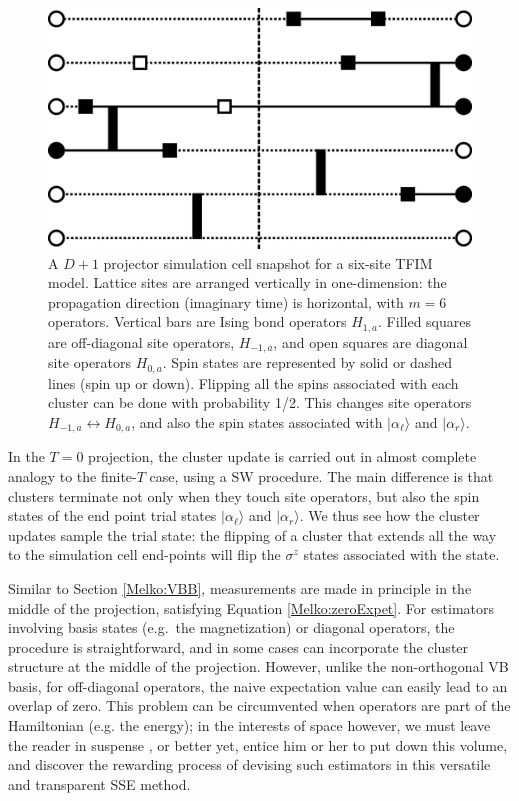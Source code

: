 \documentclass[vecphys]{svmult}
\begin{document}
\begin{figure}[t]
\centering
\includegraphics*[width=.85\textwidth]{zeroT_tfim.eps}
\caption[]{A $D+1$ projector simulation cell snapshot for a six-site TFIM model.  Lattice sites are arranged vertically in one-dimension: the propagation direction (imaginary time) is horizontal, with $m=6$ operators.  
Vertical bars are Ising bond operators $H_{1,a}$.  Filled squares are off-diagonal site operators, $H_{-1,a}$, and open squares are diagonal site operators $H_{0,a}$.
Spin states are represented by solid or dashed lines (spin up or down).  Flipping all the spins associated with each cluster can be done with probability 1/2.  This changes site operators $H_{-1,a} \leftrightarrow H_{0,a}$, and also the spin states associated with  $|\alpha_{\ell} \rangle$ and $|\alpha_r \rangle$.}
\label{Melko:fig:5}      
\end{figure} 

In the $T=0$ projection, the cluster update is carried out in almost complete analogy to the finite-$T$ case, using a SW procedure.  The main difference is that clusters terminate not only when they touch site operators, but also the spin states of the end point trial states $|\alpha_{\ell} \rangle$ and $|\alpha_r \rangle$.  We thus see how the cluster updates sample the trial state: the flipping of a cluster that extends all the way to the simulation cell end-points will flip the $\sigma^z$ states associated with the state. 

Similar to Section \ref{Melko:VBB}, measurements are made in principle in the middle of the projection, satisfying Equation \ref{Melko:zeroExpet}.  
For estimators involving basis states (e.g.~the magnetization) or diagonal operators, the procedure is straightforward, and in some cases can incorporate the cluster structure at the middle of the projection.
However, unlike the non-orthogonal VB basis, for off-diagonal operators, the naive expectation value can easily lead to an overlap of zero.  This problem can be circumvented when operators are part of the Hamiltonian (e.g. the energy); in the interests of space however, we must leave the reader in suspense \cite{Melko:unpub}, or better yet, entice him or her to put down this volume, and discover the rewarding process of devising such estimators in this versatile and transparent SSE method.
\end{document}
